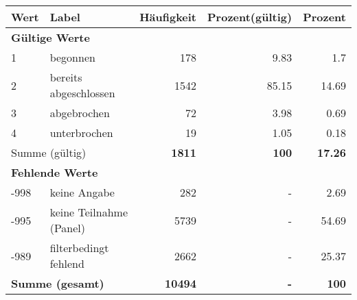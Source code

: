      \begin{longtable}{lXrrr}
     \toprule
     \textbf{Wert} & \textbf{Label} & \textbf{Häufigkeit} & \textbf{Prozent(gültig)} & \textbf{Prozent} \\
     \endhead
     \midrule
     \multicolumn{5}{l}{\textbf{Gültige Werte}}\\

     1 &
     \multicolumn{1}{X}{ begonnen   } &


       \num{178} &
       \num[round-mode=places,round-precision=2]{9,83} &
         \num[round-mode=places,round-precision=2]{1,7} \\

     2 &
     \multicolumn{1}{X}{ bereits abgeschlossen   } &


       \num{1542} &
       \num[round-mode=places,round-precision=2]{85,15} &
         \num[round-mode=places,round-precision=2]{14,69} \\

     3 &
     \multicolumn{1}{X}{ abgebrochen   } &


       \num{72} &
       \num[round-mode=places,round-precision=2]{3,98} &
         \num[round-mode=places,round-precision=2]{0,69} \\

     4 &
     \multicolumn{1}{X}{ unterbrochen   } &


       \num{19} &
       \num[round-mode=places,round-precision=2]{1,05} &
         \num[round-mode=places,round-precision=2]{0,18} \\
     \midrule
     \multicolumn{2}{l}{Summe (gültig)} &
       \textbf{\num{1811}} &
     \textbf{100} &
       \textbf{\num[round-mode=places,round-precision=2]{17,26}} \\
     \multicolumn{5}{l}{\textbf{Fehlende Werte}}\\
       -998 &
       keine Angabe &
         \num{282} &
        - &
         \num[round-mode=places,round-precision=2]{2,69} \\
       -995 &
       keine Teilnahme (Panel) &
         \num{5739} &
        - &
         \num[round-mode=places,round-precision=2]{54,69} \\
       -989 &
       filterbedingt fehlend &
         \num{2662} &
        - &
         \num[round-mode=places,round-precision=2]{25,37} \\
     \midrule
     \multicolumn{2}{l}{\textbf{Summe (gesamt)}} &
          \textbf{\num{10494}} &
        \textbf{-} &
        \textbf{100} \\
     \bottomrule
     \end{longtable}
     
